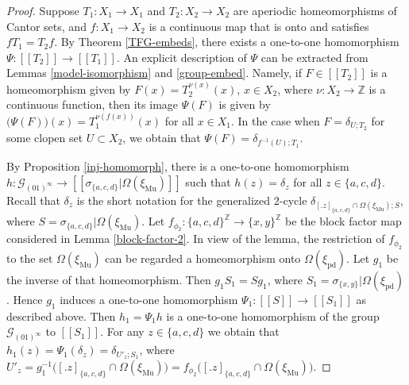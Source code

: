 \documentclass[12pt]{article}
\theoremstyle{definition}
\def\bZ{\mathbb{Z}}
\def\cG{\mathcal{G}}
\def\de{\delta}
\def\si{\sigma}
\def\Om{\Omega}
\def\xipd{\xi_{\mathrm{pd}}}
\def\xiGE{\xi_{\mathrm{Mu}}}
\begin{document}
\begin{proof}
Suppose $T_1:X_1\to X_1$ and $T_2:X_2\to X_2$ are aperiodic homeomorphisms 
of Cantor sets, and $f:X_1\to X_2$ is a continuous map that is onto and 
satisfies $fT_1=T_2f$.  By Theorem \ref{TFG-embeds}, there exists a 
one-to-one homomorphism $\Psi:[[T_2]]\to[[T_1]]$.  An explicit description 
of $\Psi$ can be extracted from Lemmas \ref{model-isomorphism} and 
\ref{group-embed}.  Namely, if $F\in[[T_2]]$ is a homeomorphism given by 
$F(x)=T_2^{\nu(x)}(x)$, $x\in X_2$, where $\nu:X_2\to\bZ$ is a continuous 
function, then its image $\Psi(F)$ is given by 
$\bigl(\Psi(F)\bigr)(x)=T_1^{\nu(f(x))}(x)$ for all $x\in X_1$.  In the 
case when $F=\de_{U;T_2}$ for some clopen set $U\subset X_2$, we obtain 
that $\Psi(F)=\de_{f^{-1}(U);T_1}$.

By Proposition \ref{inj-homomorph}, there is a one-to-one homomorphism 
$h:\cG_{(01)^\infty}\to[[\si_{\{a,c,d\}}|\Om(\xiGE)]]$ such that 
$h(z)=\de_z$ for all $z\in\{a,c,d\}$.  Recall that $\de_z$ is the short 
notation for the generalized $2$-cycle 
$\de_{[.z]_{\{a,c,d\}}\cap\Om(\xiGE);S}$, where 
$S=\si_{\{a,c,d\}}|\Om(\xiGE)$.  Let 
$f_{\phi_2}:\{a,c,d\}^{\bZ}\to\{x,y\}^{\bZ}$ be the block factor map 
considered in Lemma \ref{block-factor-2}.  In view of the lemma, the 
restriction of $f_{\phi_2}$ to the set $\Om(\xiGE)$ can be regarded a 
homeomorphism onto $\Om(\xipd)$.  Let $g_1$ be the inverse of that 
homeomorphism.  Then $g_1S_1=Sg_1$, where $S_1=\si_{\{x,y\}}|\Om(\xipd)$.
Hence $g_1$ induces a one-to-one homomorphism $\Psi_1:[[S]]\to[[S_1]]$ as 
described above.  Then $h_1=\Psi_1h$ is a one-to-one homomorphism of the 
group $\cG_{(01)^\infty}$ to $[[S_1]]$.  For any $z\in\{a,c,d\}$ we obtain 
that $h_1(z)=\Psi_1(\de_z)=\de_{U'_z;S_1}$, where $U'_z= 
g_1^{-1}\bigl([.z]_{\{a,c,d\}}\cap\Om(\xiGE)\bigr)
=f_{\phi_2}\bigl([.z]_{\{a,c,d\}}\cap\Om(\xiGE)\bigr)$.


\end{proof}
\end{document}
